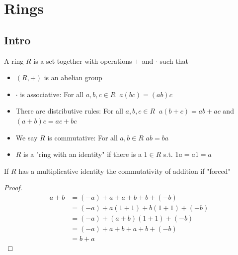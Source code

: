 \section{Rings}
\subsection{Intro}

\begin{definition}
    A ring $R$ is a set together with operations
    $+$ and $\cdot$ such that 
    \begin{itemize}
        \item $(R,+)$ is an abelian group
        \item $\cdot$ is associative: For all $a,b,c\in R\;\; a(bc)=(ab)c$ 
        \item There are distributive rules: For all $a,b,c \in R\;\; a(b+c)=ab+ac$ and $(a+b)c=ac+bc$
        \item We say $R$ is commutative: For all $a,b \in R$ $ab=ba$
        \item $R$ is a "ring with an identity" if there is a $1\in R$ s.t. $1a=a1=a$ 
    \end{itemize}
\end{definition}

\begin{proposition}
    If $R$ has a multiplicative identity the commutativity
    of addition if "forced"
\end{proposition}

\begin{proof}
    \begin{align*}
        a+b&=(-a)+a+a+b+b+(-b)\\
           &=(-a)+a(1+1)+b(1+1)+(-b)\\
           &=(-a)+(a+b)(1+1)+(-b)\\
           &=(-a)+a+b+a+b+(-b)\\
           &=b+a
    \end{align*}
\end{proof}

